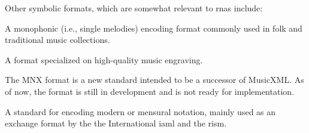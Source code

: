 

Other symbolic formats, which are somewhat relevant to \glspl{rna} include:


A monophonic (i.e., single melodies) encoding format commonly used in folk and traditional music collections.


A format specialized on high-quality music engraving.



The MNX format is a new standard intended to be a successor of MusicXML. As of now, the format is still in development and is not ready for implementation.


A standard for encoding modern or mensural notation, mainly used as an exchange format by the the International \gls{iaml} and the \gls{rism}.
